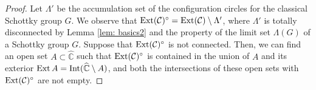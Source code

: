 \documentclass[10pt,a4paper]{amsart}
\DeclareMathOperator{\Ext}{\rm Ext}
\DeclareMathOperator{\Int}{\rm Int}
\begin{document}
\begin{proof}
 
% 
 Let $\Lambda'$ be the accumulation set of the configuration circles for the classical Schottky group $G$.
 We observe that $\Ext (\mathcal{C})^{\circ}=\Ext (\mathcal{C}) \setminus \Lambda'$, 
 where $\Lambda'$ is
 totally disconnected by Lemma \ref{lem: basics2} and the property of the limit set $\Lambda(G)$
 of a Schottky group $G$. Suppose that $\Ext (\mathcal{C})^{\circ}$ is not connected.
 Then, we can find an open set $A \subset \widehat{\mathbb C}$ such that $\Ext (\mathcal{C})^{\circ}$ is contained 
in the union of
$A$ and its exterior $\Ext A=\Int(\widehat{\mathbb C} \setminus A)$, and 
both the intersections of these open sets with
$\Ext (\mathcal{C})^{\circ}$ are not empty. 

\end{proof}
\end{document}
